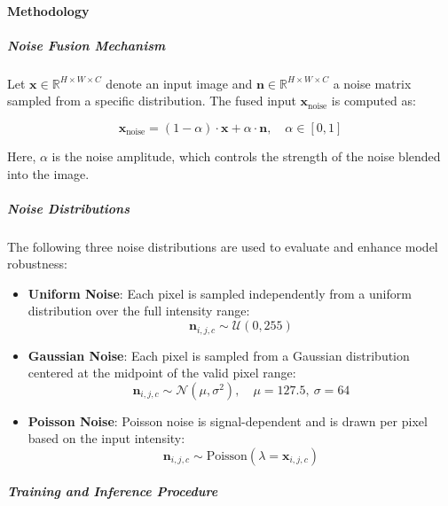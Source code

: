 \documentclass[../main.tex]{subfiles}
\begin{document}
\paragraph{Methodology}



\subparagraph{Noise Fusion Mechanism}

Let $\mathbf{x} \in \mathbb{R}^{H \times W \times C}$ denote an input image and $\mathbf{n} \in \mathbb{R}^{H \times W \times C}$ a noise matrix sampled from a specific distribution. The fused input $\mathbf{x}_{\text{noise}}$ is computed as:

\begin{equation}
    \mathbf{x}_{\text{noise}} = (1 - \alpha) \cdot \mathbf{x} + \alpha \cdot \mathbf{n}, \quad \alpha \in [0, 1]
\end{equation}

Here, $\alpha$ is the noise amplitude, which controls the strength of the noise blended into the image.
\subparagraph*{Noise Distributions}

The following three noise distributions are used to evaluate and enhance model robustness:

\begin{itemize}
    \item \textbf{Uniform Noise}: Each pixel is sampled independently from a uniform distribution over the full intensity range:
    \begin{equation}
        \mathbf{n}_{i,j,c} \sim \mathcal{U}(0, 255)
    \end{equation}
    
    \item \textbf{Gaussian Noise}: Each pixel is sampled from a Gaussian distribution centered at the midpoint of the valid pixel range:
    \begin{equation}
        \mathbf{n}_{i,j,c} \sim \mathcal{N}(\mu, \sigma^2), \quad \mu = 127.5,\ \sigma = 64
    \end{equation}
    
    \item \textbf{Poisson Noise}: Poisson noise is signal-dependent and is drawn per pixel based on the input intensity:
    \begin{equation}
        \mathbf{n}_{i,j,c} \sim \text{Poisson}(\lambda = \mathbf{x}_{i,j,c})
    \end{equation}
\end{itemize}

\subparagraph{Training and Inference Procedure}
\end{document}
